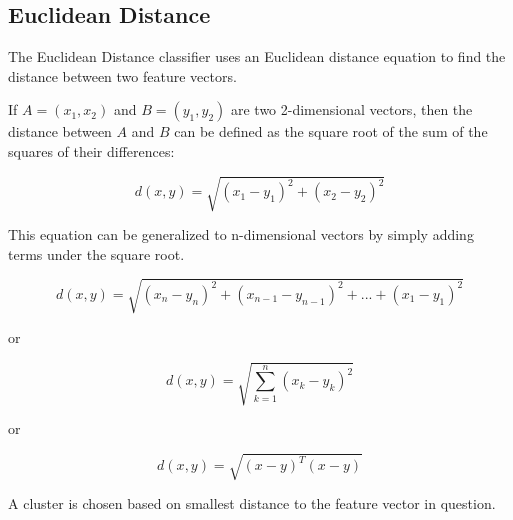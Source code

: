 \subsection{Euclidean Distance}

The Euclidean Distance classifier uses an Euclidean distance equation to find the
distance between two feature vectors.

If $A=(x_{1},x_{2})$ and $B=(y_{1},y_{2})$ are two 2-dimensional vectors, then the distance between
$A$ and $B$ can be defined as the square root of the sum of the squares of their
differences:

$$ d(x,y) = \sqrt{(x_{1}-y_{1})^{2} + {(x_{2}-y_{2})}^{2}} $$

This equation can be generalized to n-dimensional vectors by simply adding terms
under the square root.

$$ d(x,y) = \sqrt{(x_{n}-y_{n})^{2} + {(x_{n-1}-y_{n-1})}^{2} + ... + {(x_{1}-y_{1})}^{2}} $$

or

$$ d(x,y) = \sqrt{\displaystyle\sum_{k=1}^{n}(x_{k}-y_{k})^{2}} $$

or

$$ d(x,y) = \sqrt{(x-y)^{T}(x-y)} $$


A cluster is chosen based on smallest distance to the feature vector in question.
